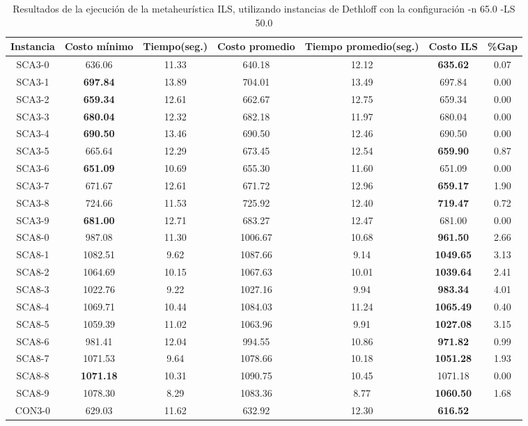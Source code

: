 \begin{table}[ht]
\caption{Resultados de la ejecución de la metaheurística ILS, utilizando instancias de Dethloff con la configuración -n 65.0 -LS 50.0}
\centering
\small
\begin{tabular}{c c c c c c c}
\hline\hline
Instancia & Costo mínimo & Tiempo(seg.) & Costo promedio & Tiempo promedio(seg.) & Costo ILS & \%Gap \\ [0.5ex]
\hline
SCA3-0 & 636.06 & 11.33 & 
640.18 & 12.12 & \bf{635.62} & 
0.07\\SCA3-1 & \bf{697.84} & 13.89 & 
704.01 & 13.49 & 697.84 & 0.00\\
SCA3-2 & \bf{659.34} & 12.61 & 
662.67 & 12.75 & 659.34 & 0.00\\
SCA3-3 & \bf{680.04} & 12.32 & 
682.18 & 11.97 & 680.04 & 0.00\\
SCA3-4 & \bf{690.50} & 13.46 & 
690.50 & 12.46 & 690.50 & 0.00\\
SCA3-5 & 665.64 & 12.29 & 
673.45 & 12.54 & \bf{659.90} & 
0.87\\SCA3-6 & \bf{651.09} & 10.69 & 
655.30 & 11.60 & 651.09 & 0.00\\
SCA3-7 & 671.67 & 12.61 & 
671.72 & 12.96 & \bf{659.17} & 
1.90\\SCA3-8 & 724.66 & 11.53 & 
725.92 & 12.40 & \bf{719.47} & 
0.72\\SCA3-9 & \bf{681.00} & 12.71 & 
683.27 & 12.47 & 681.00 & 0.00\\
SCA8-0 & 987.08 & 11.30 & 
1006.67 & 10.68 & \bf{961.50} & 
2.66\\SCA8-1 & 1082.51 & 9.62 & 
1087.66 & 9.14 & \bf{1049.65} & 
3.13\\SCA8-2 & 1064.69 & 10.15 & 
1067.63 & 10.01 & \bf{1039.64} & 
2.41\\SCA8-3 & 1022.76 & 9.22 & 
1027.16 & 9.94 & \bf{983.34} & 
4.01\\SCA8-4 & 1069.71 & 10.44 & 
1084.03 & 11.24 & \bf{1065.49} & 
0.40\\SCA8-5 & 1059.39 & 11.02 & 
1063.96 & 9.91 & \bf{1027.08} & 
3.15\\SCA8-6 & 981.41 & 12.04 & 
994.55 & 10.86 & \bf{971.82} & 
0.99\\SCA8-7 & 1071.53 & 9.64 & 
1078.66 & 10.18 & \bf{1051.28} & 
1.93\\SCA8-8 & \bf{1071.18} & 10.31 & 
1090.75 & 10.45 & 1071.18 & 0.00\\
SCA8-9 & 1078.30 & 8.29 & 
1083.36 & 8.77 & \bf{1060.50} & 
1.68\\CON3-0 & 629.03 & 11.62 & 
632.92 & 12.30 & \bf{616.52} & 

\end{tabular}
\end{table}
